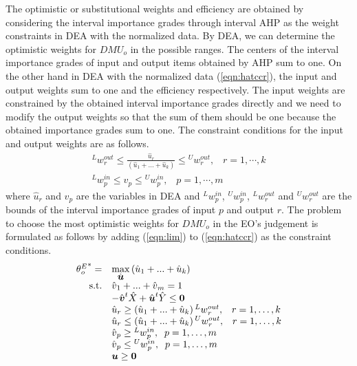 The optimistic or substitutional weights and efficiency are obtained by considering the interval importance grades through interval AHP as the weight constraints in DEA with the normalized data. 
By DEA, we can determine the optimistic weights for $DMU_o$ in the possible ranges. 
The centers of the interval importance grades of input and output items obtained by AHP sum to one.
On the other hand in DEA with the normalized data (\ref{eqn:hatccr}), the input and output weights sum to one and the efficiency respectively. 
The input weights are constrained by the obtained interval importance grades directly and we need to modify the output weights so that the sum of them should be one because the obtained importance grades sum to one. 
The constraint conditions for the input and output weights are as follows. 
\begin{equation} 
\begin{array}{l}
{^L{w}{_{r}^{out}}} \leq 
\frac{\hat{\mbox{$u$}}_{r}}
{\left({\hat{\mbox{$u$}}_{1}}+...+\hat{\mbox{$u$}}_{k}\right)} 
\leq {^U{w}{_{r}^{out}}},\;\;\;r=1,\cdots,k\\
{^L{w}{_{p}^{in}}} \leq {\hat{\mbox{$v$}}_{p}}  \leq {^U{w}{_{p}^{in}}},\;\;\;p=1,\cdots,m
\end{array} 
\label{eqn:lim}
\end{equation}
where $\hat{\mbox{$u$}}_{r}$ and $\hat{\mbox{$v$}}_{p}$ are the variables in DEA and ${^L{w}{_{p}^{in}}}$, ${^U{w}{_{p}^{in}}}$, ${^L{w}{_{r}^{out}}}$ and ${^U{w}{_{r}^{out}}}$ are the bounds of the interval importance grades of input $p$ and output $r$. 
The problem to choose the most optimistic weights for $DMU_o$ in the EO's judgement is formulated as follows by adding (\ref{eqn:lim}) to (\ref{eqn:hatccr}) as the constraint conditions. 
\begin{equation} \begin{array}{rl}
{\theta{_o^E}}^*=& {\displaystyle \max_{\hat{\mbox{\boldmath$u$}}}} \left({\hat{\mbox{$u$}}_{1}}+...+{\hat{\mbox{$u$}}_{k}}\right)  \\
{\rm{s.t.}} & {\hat{\mbox{$v$}}_{1}}+...+{\hat{\mbox{$v$}}_{m}} = 1 \\
 & -\hat{\mbox{\boldmath$v$}}^t\hat{X}+\hat{\mbox{\boldmath$u$}}^t\hat{Y}  \leq \mbox{\bf 0} \\
& \hat{\mbox{$u$}}_{r} \geq \left({\hat{\mbox{$u$}}_{1}}+...+{\hat{\mbox{$u$}}_{k}}\right){^L{w}{_{r}^{out}}},\;\;\; r=1,\ldots,k \\
&\hat{\mbox{$u$}}_{r} \leq  \left({\hat{\mbox{$u$}}_{1}}+...+{\hat{\mbox{$u$}}_{k}}\right){^U{w}{_{r}^{out}}},\;\;\; r=1,\ldots,k \\
&{\hat{\mbox{$v$}}_{p}} \geq {^L{w}{_{p}^{in}}},\;\;p=1,\ldots,m\\
& {\hat{\mbox{$v$}}_{p}}  \leq  {^U{w}{_{p}^{in}}},\;\;p=1,\ldots,m  \\
& \mbox{\boldmath$u$}  \geq  \mbox{\bf 0}  \\   
\end{array} 
\label{eqn:hatccrlim}
\end{equation}

